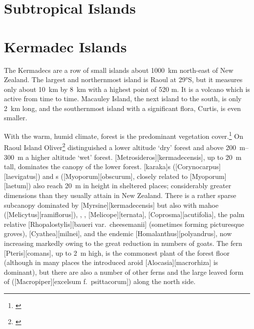 \section{Subtropical Islands}

\section{Kermadec Islands}

The Kermadecs are a row of small islands about \SI{1000}{\kilo\metre} north-east of New Zealand.
The largest and northernmost island is Raoul at \ang{29}S, but it measures only about \SI{10}{\kilo\metre} by \SI{8}{\kilo\metre} with a highest point of 520 m.
It is a volcano which is active from time to time.
Macauley Island, the next island to the south, is only \SI{2}{\kilo\metre} long, and the southernmost island with a significant flora, Curtis, is even smaller.

With the warm, humid climate, forest is the predominant vegetation cover.\footnote{\cite{sykes1977annotated}}
On Raoul Island Oliver\footnote{\cite{oliver1910vegetation}} distinguished a lower altitude `dry' forest and above \SIrange{200}{300}{\metre} a higher altitude `wet' forest. [Metrosideros][kermadecensis], up to \SI{20}{\metre} tall, dominates the canopy of the lower forest.
[karaka]s ([Corynocarpus][laevigatus]) and s ([Myoporum][obscurum], closely related to [Myoporum][laetum]) also reach \SI{20}{\metre} in height in sheltered places; considerably greater dimensions than they usually attain in New Zealand.
There is a rather sparse subcanopy dominated by [Myrsine][kermadecensis] but also with mahoe ([Melicytus][ramiflorus]), , , [Melicope][ternata], [Coprosma][acutifolia], the  palm relative [Rhopalostylis][baueri var.\ cheesemanii] (sometimes forming picturesque groves), [Cyathea][milnei], and the endemic [Homalanthus][polyandrus], now increasing markedly owing to the great reduction in numbers of goats.
The fern [Pteris][comans], up to \SI{2}{\metre} high, is the commonest plant of the forest floor (although in many places the introduced aroid [Alocasia][macrorhiza] is dominant), but there are also a number of other ferns and the large leaved form of  ([Macropiper][excelsum f.\ psittacorum]) along the north side.

